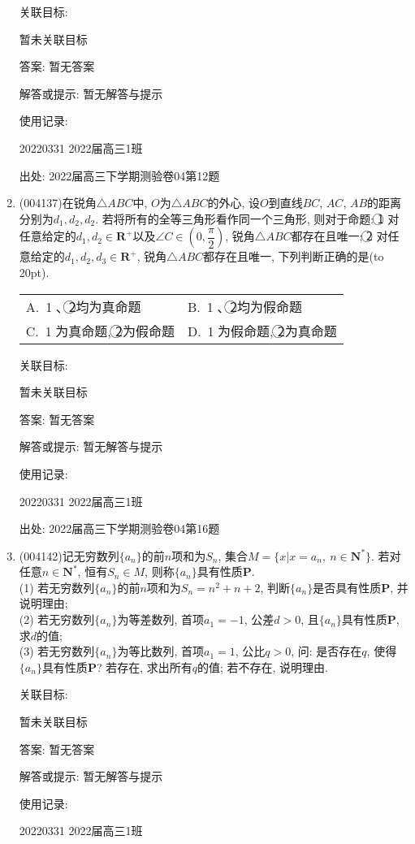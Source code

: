 \documentclass[10pt,a4paper]{article}
\newcommand{\bracket}[1]{(\hbox to #1pt{})}
\newcommand{\twoch}[4]{\par\begin{tabular}{p{.46\textwidth}p{.46\textwidth}}
A.~#1& B.~#2\\
C.~#3& D.~#4
\end{tabular}}
\begin{document}
\begin{enumerate}[1.]
关联目标:

暂未关联目标

答案: 暂无答案

解答或提示: 暂无解答与提示

使用记录:

20220331	2022届高三1班	


出处: 2022届高三下学期测验卷04第12题
\item { (004137)}在锐角$\triangle ABC$中, $O$为$\triangle ABC$的外心, 设$O$到直线$BC$, $AC$, $AB$的距离分别为$d_1,d_2,d_2$. 若将所有的全等三角形看作同一个三角形, 则对于命题: \textcircled{1} 对任意给定的$d_1,d_2\in \mathbf{R}^+$以及$\angle C\in (0,\dfrac\pi 2)$, 锐角$\triangle ABC$都存在且唯一; \textcircled{2} 对任意给定的$d_1,d_2,d_3\in \mathbf{R}^+$, 锐角$\triangle ABC$都存在且唯一, 下列判断正确的是\bracket{20}.
\twoch{\textcircled{1}、\textcircled{2}均为真命题}{\textcircled{1}、\textcircled{2}均为假命题}{\textcircled{1}为真命题, \textcircled{2}为假命题}{\textcircled{1}为假命题, \textcircled{2}为真命题}


关联目标:

暂未关联目标

答案: 暂无答案

解答或提示: 暂无解答与提示

使用记录:

20220331	2022届高三1班	


出处: 2022届高三下学期测验卷04第16题
\item { (004142)}记无穷数列$\{a_n\}$的前$n$项和为$S_n$, 集合$M=\{x|x=a_n, \ n\in \mathbf{N}^*\}$. 若对任意$n\in \mathbf{N}^*$, 恒有$S_n\in M$, 则称$\{a_n\}$具有性质$\mathbf{P}$.\\
(1) 若无穷数列$\{a_n\}$的前$n$项和为$S_n=n^2+n+2$, 判断$\{a_n\}$是否具有性质$\mathbf{P}$, 并说明理由;\\
(2) 若无穷数列$\{a_n\}$为等差数列, 首项$a_1=-1$, 公差$d>0$, 且$\{a_n\}$具有性质$\mathbf{P}$, 求$d$的值;\\
(3) 若无穷数列$\{a_n\}$为等比数列, 首项$a_1=1$, 公比$q>0$, 问: 是否存在$q$, 使得$\{a_n\}$具有性质$\mathbf{P}$? 若存在, 求出所有$q$的值; 若不存在, 说明理由.


关联目标:

暂未关联目标

答案: 暂无答案

解答或提示: 暂无解答与提示

使用记录:

20220331	2022届高三1班			



\end{enumerate}
\end{document}

